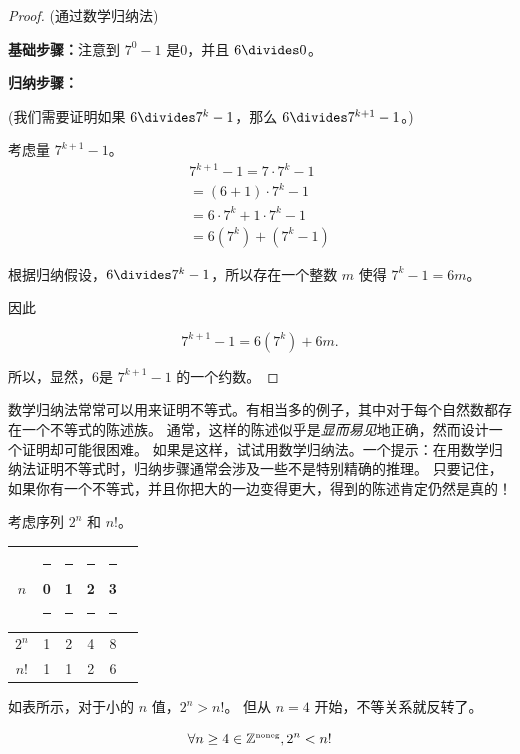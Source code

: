 \begin{proof} (通过数学归纳法)


{\bf 基础步骤：}注意到 $7^0-1$ 是0，并且 $6 \divides 0$。

{\bf 归纳步骤：}

\noindent (我们需要证明如果 $6 \divides 7^k-1$，那么 $6 \divides 7^{k+1}-1$。)

\noindent 考虑量 $7^{k+1}-1$。
\begin{gather*}
7^{k+1}-1 = 7 \cdot 7^k -1 \\
 = (6 + 1) \cdot 7^k - 1 \\
 = 6 \cdot 7^k + 1 \cdot 7^k - 1\\
 = 6(7^k) + (7^k - 1)
\end{gather*}

\noindent 根据归纳假设，$6 \divides 7^k - 1$，所以存在一个整数 $m$ 使得 $7^k - 1 = 6m$。

因此

\[ 7^{k+1}-1 = 6(7^k) + 6m. \]

所以，显然，6是 $7^{k+1}-1$ 的一个约数。
\end{proof}

数学归纳法常常可以用来证明不等式。有相当多的例子，其中对于每个自然数都存在一个不等式的陈述族。
通常，这样的陈述似乎是\emph{显而易见}地正确，然而设计一个证明却可能很困难。
如果是这样，试试用数学归纳法。一个提示：在用数学归纳法证明不等式时，归纳步骤通常会涉及一些不是特别精确的推理。
只要记住，如果你有一个不等式，并且你把大的一边变得更大，得到的陈述肯定仍然是真的！

考虑序列 $2^n$ 和 $n!$。

\begin{center}
\begin{tabular}{c|ccccc}
$n$   & \rule{6pt}{0pt} 0 \rule{6pt}{0pt} & \rule{6pt}{0pt} 1 \rule{6pt}{0pt} &\rule{6pt}{0pt} 2 \rule{6pt}{0pt} & \rule{6pt}{0pt} 3 \rule{6pt}{0pt} & \\ \hline
$2^n$ & 1 & 2 & 4 & 8 & \\ \hline
$n!$  & 1 & 1 & 2 & 6 & \\
\end{tabular}
\end{center}

如表所示，对于小的 $n$ 值，$2^n > n!$。
但从 $n=4$ 开始，不等关系就反转了。

\begin{thm} 
\[ \forall n \geq 4 \in {\mathbb Z}^{\mbox{\tiny noneg}}, 2^n < n!
\]
\end{thm}

